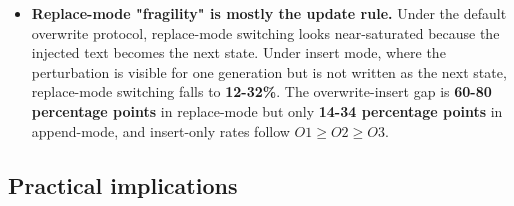\documentclass{article}
\theoremstyle{plain}
\theoremstyle{definition}
\begin{document}
\begin{itemize}
  straddling zero). The simpler retained source-basin escape
  endpoint stays high and monotone across all these checks. A
  useful secondary result from the heterogeneity control: retained
  source-basin escape was lower under homogeneous repetition
  (\textbf{0.54-0.58}) than under heterogeneous concatenation
  (\textbf{0.74-0.79}), suggesting that repeated content is easier for
  the loop to recover from.
  \item \textbf{Replace-mode "fragility" is mostly the update rule.} Under
  the default overwrite protocol, replace-mode switching looks
  near-saturated because the injected text becomes the next state.
  Under insert mode, where the perturbation is visible for one
  generation but is not written as the next state, replace-mode
  switching falls to \textbf{12-32\%}. The overwrite-insert gap is
  \textbf{60-80 percentage points} in replace-mode but only \textbf{14-34
  percentage points} in append-mode, and insert-only rates follow
  $O1 \ge O2 \ge O3$.
\end{itemize}

\subsection*{Practical implications}
\end{document}

